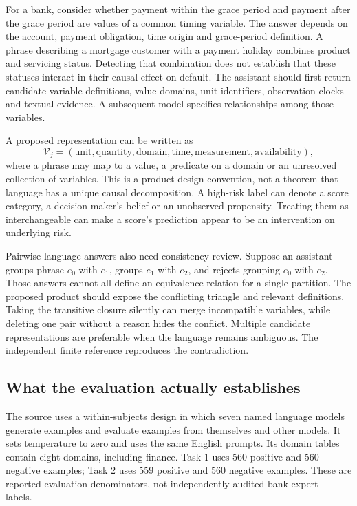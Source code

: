 For a bank, consider whether payment within the grace period and payment after the grace period are values of a common timing variable. The answer depends on the account, payment obligation, time origin and grace-period definition. A phrase describing a mortgage customer with a payment holiday combines product and servicing status. Detecting that combination does not establish that these statuses interact in their causal effect on default. The assistant should first return candidate variable definitions, value domains, unit identifiers, observation clocks and textual evidence. A subsequent model specifies relationships among those variables.

A proposed representation can be written as
\begin{equation}
 \mathcal V_j=(\text{unit},\text{quantity},\text{domain},\text{time},
                \text{measurement},\text{availability}),
\end{equation}
where a phrase may map to a value, a predicate on a domain or an unresolved collection of variables. This is a product design convention, not a theorem that language has a unique causal decomposition. A high-risk label can denote a score category, a decision-maker's belief or an unobserved propensity. Treating them as interchangeable can make a score's prediction appear to be an intervention on underlying risk.

Pairwise language answers also need consistency review. Suppose an assistant groups phrase $e_0$ with $e_1$, groups $e_1$ with $e_2$, and rejects grouping $e_0$ with $e_2$. Those answers cannot all define an equivalence relation for a single partition. The proposed product should expose the conflicting triangle and relevant definitions. Taking the transitive closure silently can merge incompatible variables, while deleting one pair without a reason hides the conflict. Multiple candidate representations are preferable when the language remains ambiguous. The independent finite reference reproduces the contradiction.~\citep{exec28_cm_reference}

\subsection{What the evaluation actually establishes}

The source uses a within-subjects design in which seven named language models generate examples and evaluate examples from themselves and other models. It sets temperature to zero and uses the same English prompts. Its domain tables contain eight domains, including finance. Task 1 uses 560 positive and 560 negative examples; Task 2 uses 559 positive and 560 negative examples. These are reported evaluation denominators, not independently audited bank expert labels.~\citep{exec28_cm_razouk}

